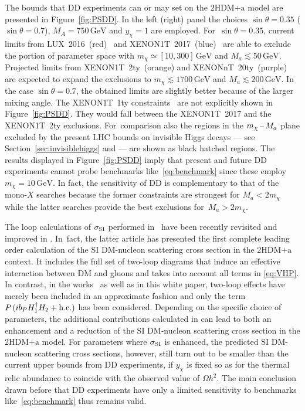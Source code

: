 \documentclass[review]{elsarticle}
\newcommand{\hdma}{\ensuremath{\textrm{2HDM+a}}\xspace}
\begin{document}
The bounds that DD experiments can or may set on the  \hdma model are presented in Figure~\ref{fig:PSDD}. In the left (right) panel the choices $\sin \theta = 0.35$ ($\sin \theta = 0.7$), $M_A = 750 \, {\mathrm{GeV}}$ and $y_\chi = 1$ are employed. For~$\sin \theta = 0.35$,  current limits from LUX~2016~(red)~\cite{Akerib:2016vxi} and  XENON1T~2017~(blue)~\cite{Aprile:2017iyp} are able to exclude the portion of parameter space with $m_\chi \simeq [10, 300 ]\, {\mathrm{GeV}}$ and $M_a \lesssim 50 \, {\mathrm{GeV}}$. Projected limits from XENON1T~2ty~(orange) and XENONnT~20ty~(purple)~\cite{Aprile:2015uzo} are expected to expand the exclusions to $m_\chi \lesssim 1700 \, {\mathrm{GeV}}$ and $M_a \lesssim 200 \, {\mathrm{GeV}}$. In the case $\sin \theta = 0.7$, the obtained limits are slightly better because of the larger mixing angle.  The XENON1T~1ty constraints~\cite{Aprile:2018dbl} are not explicitly shown  in Figure~\ref{fig:PSDD}. They would fall between the  XENON1T~2017 and the XENON1T~2ty exclusions. For~comparison also the regions in the $m_\chi \hspace{0.5mm}$--$\hspace{0.5mm} M_a$ plane excluded by the present  LHC bounds on invisible Higgs decays --- see Section~\ref{sec:invisiblehiggs} and \cite{Bauer:2017ota} --- are shown as black hatched regions.  The results displayed in Figure~\ref{fig:PSDD} imply that present and future DD experiments cannot probe benchmarks like~\eqref{eq:benchmark} since these employ $m_\chi = 10 \, {\mathrm{GeV}}$. In fact, the sensitivity of DD is complementary to that of the mono-$X$ searches because the former constraints are strongest for $M_a < 2 m_\chi$ while the latter searches provide the best exclusions for~$M_a > 2 m_\chi$. 

The loop calculations of  $\sigma_{\rm SI}$ performed in~\cite{Ipek:2014gua,Arcadi:2017wqi,Sanderson:2018lmj,Li:2018qip} have been recently revisited and improved in \cite{Abe:2018emu}.  In~fact, the latter article has presented the first complete leading order calculation of the SI DM-nucleon scattering cross section in the  \hdma context. It includes the full set of two-loop diagrams that induce an effective interaction between DM and gluons and takes into account all terms in \eqref{eq:VHP}. In contrast, in the works~\cite{Ipek:2014gua,Arcadi:2017wqi,Sanderson:2018lmj,Li:2018qip}  as well as in this white paper, two-loop effects have merely been included in an approximate fashion and only the term $P  \hspace{0.5mm} ( i  b_P   H_1^\dagger H_2 + {\rm h.c.} )$ has been considered. Depending on the specific choice of parameters, the additional contributions calculated in \cite{Abe:2018emu} can lead to both an enhancement and a reduction of the SI DM-nucleon scattering cross section in the \hdma model. For parameters where $\sigma_{\rm SI}$ is enhanced, the predicted SI DM-nucleon scattering cross sections, however, still turn out to be smaller than the current upper bounds from DD experiments, if $y_\chi$ is fixed so as for the  thermal relic abundance to coincide with the observed value of $\Omega h^{2}$. The main conclusion drawn before that DD experiments have only a limited sensitivity to benchmarks like~\eqref{eq:benchmark} thus remains valid.  
\end{document}
